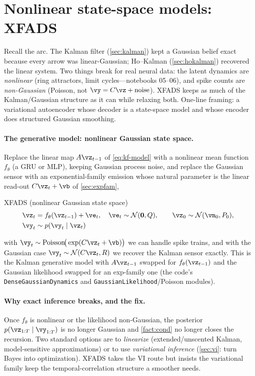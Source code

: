 \documentclass[11pt]{article}
\theoremstyle{plain}
\theoremstyle{definition}
\theoremstyle{remark}
\theoremstyle{definition}
\newcommand{\Normal}{\mathcal{N}}
\begin{document}
\section{Nonlinear state-space models: XFADS}\label{sec:xfads}

Recall the arc. The Kalman filter (\cref{sec:kalman}) kept a Gaussian belief exact
because every arrow was linear-Gaussian; Ho--Kalman (\cref{sec:hokalman}) recovered
the linear system. Two things break for real neural data: the latent dynamics are
\emph{nonlinear} (ring attractors, limit cycles---notebooks 05--06), and spike
counts are \emph{non-Gaussian} (Poisson, not $\vy = C\vz + \text{noise}$). XFADS
\parencite{Dowling2024-xfads} keeps as much of the Kalman/Gaussian structure as it
can while relaxing both. One-line framing: a variational autoencoder whose decoder
is a state-space model and whose encoder does structured Gaussian smoothing.

\paragraph{The generative model: nonlinear Gaussian state space.} Replace the
linear map $A\vz_{t-1}$ of \eqref{eq:kf-model} with a nonlinear mean function
$f_{\theta}$ (a GRU \parencite{Cho2014-gru} or MLP), keeping Gaussian process
noise, and replace the Gaussian sensor with an exponential-family emission whose
natural parameter is the linear read-out $C\vz_t + \vb$ of \cref{sec:expfam},
\begin{genmodel}{XFADS (nonlinear Gaussian state space)}
\begin{align}
    \vz_t &= f_{\theta}(\vz_{t-1}) + \ve_t, \quad \ve_t\sim\Normal(\mathbf 0, Q),
        \qquad \vz_0\sim\Normal(\vm_0, P_0), \label{eq:xf-dyn}\\
    \vy_t &\sim p(\vy_t \mid \vz_t)
\end{align}
\end{genmodel}
\noindent
with $\vy_t \sim \mathrm{Poisson}\!\big(\exp(C\vz_t + \vb)\big)$ we can handle spike trains, and
with the Gaussian case $\vy_t\sim\Normal(C\vz_t, R)$ we recover the Kalman sensor exactly.
This is the Kalman generative model with $A\vz_{t-1}$ swapped for
$f_{\theta}(\vz_{t-1})$ and the Gaussian likelihood swapped for an exp-family one
(the code's \texttt{DenseGaussianDynamics} and \texttt{GaussianLikelihood}/Poisson
modules).

\paragraph{Why exact inference breaks, and the fix.} Once $f_{\theta}$ is nonlinear
or the likelihood non-Gaussian, the posterior $p(\vz_{1:T}\mid\vy_{1:T})$ is no
longer Gaussian and \cref{fact:cond} no longer closes the recursion. Two standard
options are to \emph{linearize} (extended/unscented Kalman, model-sensitive
approximations) or to use \emph{variational inference} (\cref{sec:vi}: turn Bayes into optimization).
XFADS takes the VI route but insists the variational family keep the
temporal-correlation structure a smoother needs.
\end{document}
